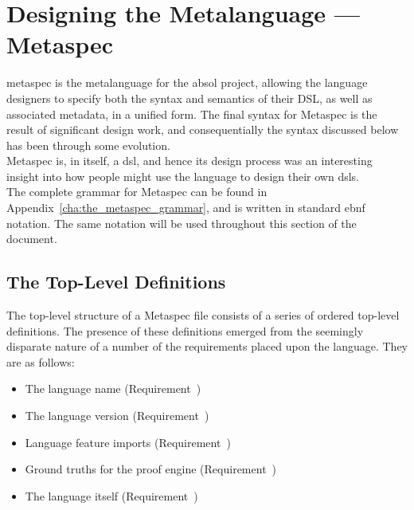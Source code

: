 \section{Designing the Metalanguage --- Metaspec} %
\label{sec:designing_the_metalanguage_metaspec}

\gls{metaspec} is the metalanguage for the \gls{absol} project, allowing the language designers to specify both the syntax and semantics of their DSL, as well as associated metadata, in a unified form. 
The final syntax for Metaspec is the result of significant design work, and consequentially the syntax discussed below has been through some evolution. \\

Metaspec is, in itself, a \gls{dsl}, and hence its design process was an interesting insight into how people might use the language to design their own \glspl{dsl}. \\

The complete grammar for Metaspec can be found in Appendix~\ref{cha:the_metaspec_grammar}, and is written in standard \gls{ebnf} notation. 
The same notation will be used throughout this section of the document. 

\subsection{The Top-Level Definitions} %
\label{sub:the_top_level_definitions}
The top-level structure of a Metaspec file consists of a series of ordered top-level definitions.
The presence of these definitions emerged from the seemingly disparate nature of a number of the requirements placed upon the language.
They are as follows:
\begin{itemize}
    \item The language name (Requirement~)
    \item The language version (Requirement~)
    \item Language feature imports (Requirement~)
    \item Ground truths for the proof engine (Requirement~)
    \item The language itself (Requirement~)
\end{itemize}


